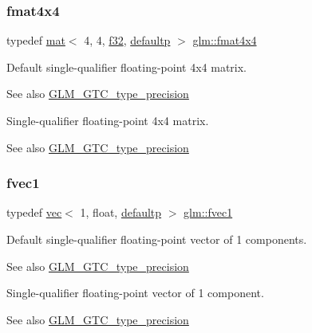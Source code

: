 \subsubsection{\texorpdfstring{fmat4x4}{fmat4x4}}
{\footnotesize\ttfamily typedef \hyperlink{structglm_1_1mat}{mat}$<$ 4, 4, \hyperlink{group__gtc__type__precision_ga0ec999b57f5330d9021256e96038df04}{f32}, \hyperlink{namespaceglm_a36ed105b07c7746804d7fdc7cc90ff25a9d21ccd8b5a009ec7eb7677befc3bf51}{defaultp} $>$ \hyperlink{group__gtc__type__precision_gaeda4baa9a8e3113ff879dd5e7bdf5334}{glm\+::fmat4x4}}

Default single-\/qualifier floating-\/point 4x4 matrix. \begin{DoxySeeAlso}{See also}
\hyperlink{group__gtc__type__precision}{G\+L\+M\+\_\+\+G\+T\+C\+\_\+type\+\_\+precision}
\end{DoxySeeAlso}
Single-\/qualifier floating-\/point 4x4 matrix. \begin{DoxySeeAlso}{See also}
\hyperlink{group__gtc__type__precision}{G\+L\+M\+\_\+\+G\+T\+C\+\_\+type\+\_\+precision} 
\end{DoxySeeAlso}
\mbox{\label{group__gtc__type__precision_gaed54853d0f184df0e5fbd9f9118c477b}} 
\subsubsection{\texorpdfstring{fvec1}{fvec1}}
{\footnotesize\ttfamily typedef \hyperlink{structglm_1_1vec}{vec}$<$ 1, float, \hyperlink{namespaceglm_a36ed105b07c7746804d7fdc7cc90ff25a9d21ccd8b5a009ec7eb7677befc3bf51}{defaultp} $>$ \hyperlink{group__gtc__type__precision_gaed54853d0f184df0e5fbd9f9118c477b}{glm\+::fvec1}}

Default single-\/qualifier floating-\/point vector of 1 components. \begin{DoxySeeAlso}{See also}
\hyperlink{group__gtc__type__precision}{G\+L\+M\+\_\+\+G\+T\+C\+\_\+type\+\_\+precision}
\end{DoxySeeAlso}
Single-\/qualifier floating-\/point vector of 1 component. \begin{DoxySeeAlso}{See also}
\hyperlink{group__gtc__type__precision}{G\+L\+M\+\_\+\+G\+T\+C\+\_\+type\+\_\+precision} 
\end{DoxySeeAlso}
\mbox{\label{group__gtc__type__precision_gaabc3d7a259968a12108c052ff9265148}} 
